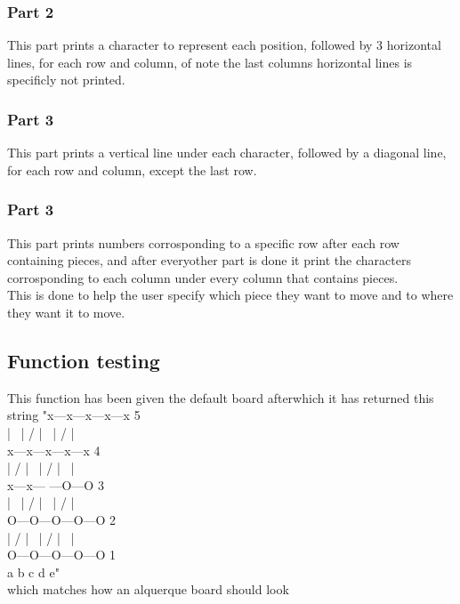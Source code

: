 \documentclass[12pt]{article}
\begin{document}
\subsubsection{Part 2}
This part prints a character to represent each position, followed by 3 horizontal lines, for each row and column, of note the last columns horizontal lines is specificly not printed.

\subsubsection{Part 3}
This part prints a vertical line under each character, followed by a diagonal line, for each row and column, except the last row.

\subsubsection{Part 3}
This part prints numbers corrosponding to a specific row after each row containing pieces, and after everyother part is done it print the characters corrosponding to each column under every column that contains pieces.\\
This is done to help the user specify which piece they want to move and to where they want it to move.

\subsection{Function testing}
This function has been given the default board afterwhich it has returned this string
"x---x---x---x---x 5\\
| \ | / | \ | / |\\
x---x---x---x---x 4\\
| / | \ | / | \ |\\
x---x--- ---O---O 3\\
| \ | / | \ | / |\\
O---O---O---O---O 2\\
| / | \ | / | \ |\\
O---O---O---O---O 1\\
a   b   c   d   e"\\
which matches how an alquerque board should look\\
\end{document}
